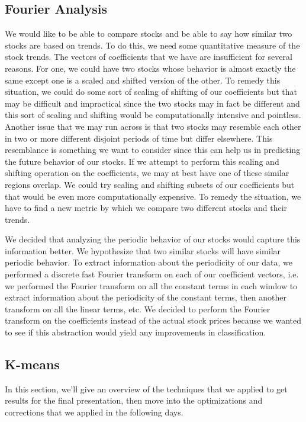 \documentclass[final]{article}
\begin{document}
\subsection{Fourier Analysis}

We would like to be able to compare stocks and be able to say how
similar two stocks are based on trends. To do this, we need some
quantitative measure of the stock trends. The vectors of coefficients
that we have are insufficient for several reasons. For one, we could
have two stocks whose behavior is almost exactly the same except one
is a scaled and shifted version of the other. To remedy this
situation, we could do some sort of scaling of shifting of our
coefficients but that may be difficult and impractical since the two
stocks may in fact be different and this sort of scaling and shifting
would be computationally intensive and pointless. Another issue that
we may run across is that two stocks may resemble each other in two or
more different disjoint periods of time but differ elsewhere. This
resemblance is something we want to consider since this can help us in
predicting the future behavior of our stocks. If we attempt to perform
this scaling and shifting operation on the coefficients, we may at
best have one of these similar regions overlap. We could try scaling
and shifting subsets of our coefficients but that would be even more
computationally expensive. To remedy the situation, we have to find a
new metric by which we compare two different stocks and their trends.

We decided that analyzing the periodic behavior of our stocks would
capture this information better. We hypothesize that two similar
stocks will have similar periodic behavior. To extract information
about the periodicity of our data, we performed a discrete fast
Fourier transform on each of our coefficient vectors, i.e. we
performed the Fourier transform on all the constant terms in each
window to extract information about the periodicity of the constant
terms, then another transform on all the linear terms, etc. We decided
to perform the Fourier transform on the coefficients instead of the
actual stock prices because we wanted to see if this abstraction would
yield any improvements in classification.

\subsection{K-means}
In this section, we'll give an overview of the techniques that we
applied to get results for the final presentation, then move into the
optimizations and corrections that we applied in the following days.
\end{document}
